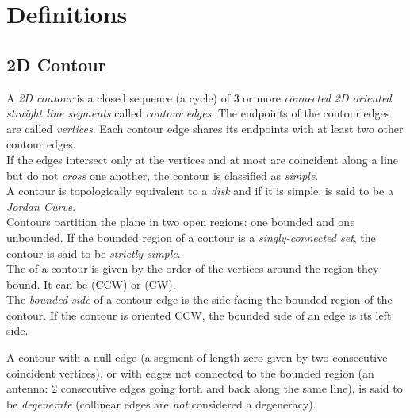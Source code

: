 
\section{Definitions}

\subsection{2D Contour}

A {\em 2D contour} is a closed sequence (a cycle) of 3 or more \textit{connected 2D oriented straight line segments} called {\em contour edges}. The endpoints of the contour edges are called {\em vertices}. Each contour edge shares its endpoints with at least two other contour edges.\\
If the edges intersect only at the vertices and at most are coincident along a line but do not {\em cross} one another, the contour is classified as {\em simple}.\\
A contour is topologically equivalent to a \textit{disk} and if it is simple, is said to be a \textit{Jordan Curve}.\\
Contours partition the plane in two open regions: one bounded and one unbounded. If the bounded region of a contour is a \textit{singly-connected set}, the contour is said to be {\em strictly-simple}.\\
The  of a contour is given by the order of the vertices around the region they bound. It can be  (CCW) or  (CW).\\
The {\em bounded side} of a contour edge is the side facing the bounded region of the contour. If the contour is oriented CCW, the bounded side of an edge is its left side.

A contour with a null edge (a segment of length zero given by two consecutive coincident vertices), or with edges not connected to the bounded region (an antenna: 2 consecutive edges going forth and back along the same line), is said to be {\em degenerate} (collinear edges are \textit{not} considered a degeneracy).

